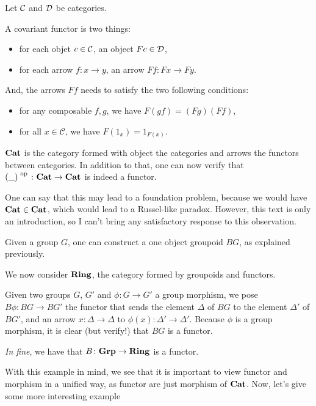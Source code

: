 \documentclass[a4paper]{article}
\theoremstyle { remark }
\newtheorem { remark } { Remark }
\theoremstyle { definition }
\newtheorem { definition } { Definition }
\newtheorem { example } { Example }
\theoremstyle { plain }
\begin{document}
\begin{definition}
Let \(  \mathcal { C }  \) and \(  \mathcal { D }  \) be categories.

A covariant functor is two things:
\begin{itemize}
  \item for each objet \( c \in  \mathcal { C }  \), an object \( F c \in  \mathcal { D }  \),
  \item for each arrow \( f \colon x \to y \), an arrow \( F f \colon F x \to F y \).
\end{itemize}

And, the arrows $Ff$ needs to satisfy the two following conditions:
\begin{itemize}
  \item for any composable $f, g$, we have $F(gf) = (Fg) (Ff)$,
  \item for all $x \in \mathcal{C}$, we have $F(1_{x}) = 1_{F(x)}$.
\end{itemize}
\end{definition}

\begin{definition}[\( \Cat \)]
\( \Cat \) is the category formed with object the categories and arrows the functors between categories.
In addition to that, one can now verify that \(  {(\_)} ^ \text { op }  \colon  \mathbf { Cat }  \to  \mathbf { Cat }  \) is indeed a functor.
\end{definition}

\begin{remark}
One can say that this may lead to a foundation problem, because we would have \(  \mathbf { Cat }  \in  \mathbf { Cat }  \), which would lead to a Russel-like paradox.
However, this text is only an introduction, so I can't bring any satisfactory response to this observation.
\end{remark}

\begin{example}
Given a group \( G \), one can construct a one object groupoid \( B G \), as explained previously.

We now consider \(  \mathbf { Ring }  \), the category formed by groupoids and functors.

Given two groups \( G \), \( G' \) and \( \phi \colon G \to G' \) a group morphism, we pose \( B \phi \colon B G \to B G' \) the functor that sends the element \( \Delta \) of \( B G \) to the element \( \Delta' \) of \( B G' \), and an arrow \( x \colon \Delta \to \Delta \) to \( \phi(x) \colon \Delta' \to \Delta' \).
Because \( \phi \) is a group morphism, it is clear (but verify!) that \( B G \) is a functor.

\textit{In fine}, we have that \( B \colon  \mathbf { Grp }  \to  \mathbf { Ring }  \) is a functor.

With this example in mind, we see that it is important to view functor and morphism in a unified way, as functor are just morphism of \( \Cat \).
Now, let's give some more interesting example
\end{example}
\end{document}
